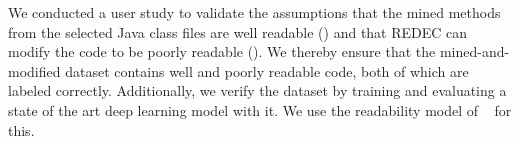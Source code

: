 \documentclass[%
class=scrreprt,
chapterprefix=false,%
open=right,%
twoside=false,%
paper=a4,%
logofile={Logo\_zentral\_farbig\_EN.png},%
thesistype=master,%
UKenglish,%
]{se2thesis}
\newcounter{urlfootnote}
\newcommand{\onecurl}[2]{%
	\stepcounter{urlfootnote}%
	\expandafter\def\csname urlfootnote:#1\endcsname{\theurlfootnote}%
	\footnote{\label{url:#1}\url{#1}, accessed: #2}%
}
\newcommand{\curl}[2]{%
	\ifcsdef{urlfootnote:#1}{%
		\textsuperscript{\ref{url:#1}}%
	}{%
		\onecurl{#1}{#2}%
	}%
}
\theoremstyle{definition}
\newcommand{\citeolddataset}{\cite{buse2009learning, dorn2012general, scalabrino2018comprehensive}\xspace}
\newcommand{\rdh}{REDEC\xspace}
\begin{document}
%	

	We conducted a user study to validate the assumptions that the mined methods from the selected Java class files are well readable () and that \rdh can modify the code to be poorly readable (). 
	We thereby ensure that the mined-and-modified dataset contains well and poorly readable code, both of which are labeled correctly.
	Additionally, we verify the dataset by training and evaluating a state of the art deep learning model with it. We use the readability model of \citeauthor{mi2022towards}~\cite{mi2022towards} for this.
		
\end{document}
